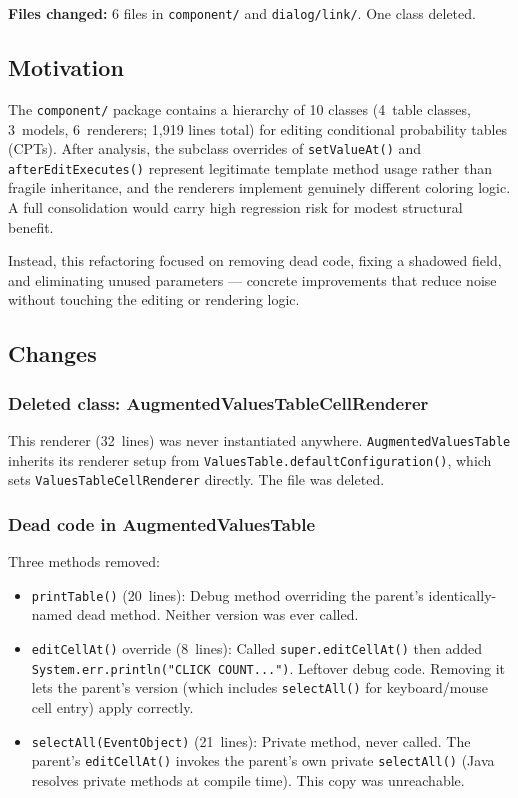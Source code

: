 \documentclass[12pt,a4paper]{article}
\newcommand{\code}[1]{\texttt{#1}}
\newcommand{\file}[1]{\texttt{#1}}
\begin{document}
\textbf{Files changed:} 6 files in \file{component/} and
\file{dialog/link/}. One class deleted.

\subsection{Motivation}

The \file{component/} package contains a hierarchy of 10 classes
(4~table classes, 3~models, 6~renderers; 1,919 lines total) for editing
conditional probability tables (CPTs). After analysis, the subclass
overrides of \code{setValueAt()} and \code{afterEditExecutes()} represent
legitimate template method usage rather than fragile inheritance, and the
renderers implement genuinely different coloring logic. A full
consolidation would carry high regression risk for modest structural
benefit.

Instead, this refactoring focused on removing dead code, fixing a
shadowed field, and eliminating unused parameters --- concrete
improvements that reduce noise without touching the editing or rendering
logic.

\subsection{Changes}

\subsubsection{Deleted class: AugmentedValuesTableCellRenderer}

This renderer (32~lines) was never instantiated anywhere.
\code{AugmentedValuesTable} inherits its renderer setup from
\code{ValuesTable.defaultConfiguration()}, which sets
\code{ValuesTableCellRenderer} directly. The file was deleted.

\subsubsection{Dead code in AugmentedValuesTable}

Three methods removed:

\begin{itemize}
  \item \code{printTable()} (20~lines): Debug method overriding the
        parent's identically-named dead method. Neither version was
        ever called.
  \item \code{editCellAt()} override (8~lines): Called
        \code{super.editCellAt()} then added
        \code{System.err.println("CLICK COUNT...")}. Leftover debug
        code. Removing it lets the parent's version (which includes
        \code{selectAll()} for keyboard/mouse cell entry) apply
        correctly.
  \item \code{selectAll(EventObject)} (21~lines): Private method,
        never called. The parent's \code{editCellAt()} invokes the
        parent's own private \code{selectAll()} (Java resolves private
        methods at compile time). This copy was unreachable.
\end{itemize}
\end{document}
